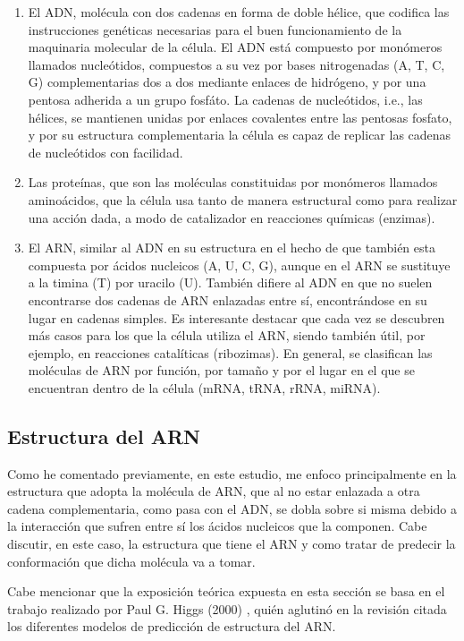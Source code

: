 \documentclass[a4paper,11pt,titlepage]{article}
\theoremstyle{definition}
\begin{document}
\begin{enumerate}
    \item El ADN, molécula con dos cadenas en forma de doble hélice, que codifica las instrucciones genéticas necesarias para el buen funcionamiento de la maquinaria molecular de la célula. El ADN está compuesto por monómeros llamados nucleótidos, compuestos a su vez por bases nitrogenadas (A, T, C, G) complementarias dos a dos mediante enlaces de hidrógeno, y por una pentosa adherida a un grupo fosfáto. La cadenas de nucleótidos, i.e., las hélices, se mantienen unidas por enlaces covalentes entre las pentosas fosfato, y por su estructura complementaria la célula es capaz de replicar las cadenas de nucleótidos con facilidad.
    \item Las proteínas, que son las moléculas constituidas por monómeros llamados aminoácidos, que la célula usa tanto de manera estructural como para realizar una acción dada, a modo de catalizador en reacciones químicas (enzimas).
    \item El ARN, similar al ADN en su estructura en el hecho de que también esta compuesta por ácidos nucleicos (A, U, C, G), aunque en el ARN se sustituye a la timina (T) por uracilo (U). También difiere al ADN en que no suelen encontrarse dos cadenas de ARN enlazadas entre sí, encontrándose en su lugar en cadenas simples. Es interesante destacar que cada vez se descubren más casos para los que la célula utiliza el ARN, siendo también útil, por ejemplo, en reacciones catalíticas (ribozimas). En general, se clasifican las moléculas de ARN por función, por tamaño y por el lugar en el que se encuentran dentro de la célula (mRNA, tRNA, rRNA, miRNA).
\end{enumerate}


\subsection{Estructura del ARN}\label{subsec:arn}

Como he comentado previamente, en este estudio, me enfoco principalmente en la estructura que adopta la molécula de ARN, que al no estar enlazada a otra cadena complementaria, como pasa con el ADN, se dobla sobre si misma debido a la interacción que sufren entre sí los ácidos nucleicos que la componen. Cabe discutir, en este caso, la estructura que tiene el ARN y como tratar de predecir la conformación que dicha molécula va a tomar.

Cabe mencionar que la exposición teórica expuesta en esta sección se basa en el trabajo realizado por Paul G. Higgs (2000) \cite{phiggs}, quién aglutinó en la revisión citada los diferentes modelos de predicción de estructura del ARN.
\end{document}
